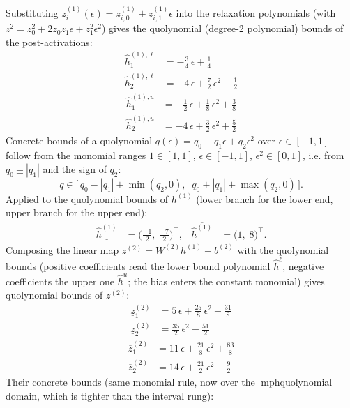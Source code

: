 \documentclass[11pt]{article}
\begin{document}
Substituting $z^{(1)}_i(\epsilon) = z^{(1)}_{i,0} + z^{(1)}_{i,1} \epsilon$ into the relaxation
polynomials (with $z^2 = z_0^2 + 2 z_0 z_1 \epsilon + z_1^2 \epsilon^2$) gives the quolynomial
(degree-2 polynomial) bounds of the post-activations:
\begin{align*}
\hat{h}^{(1),\ell}_{1} &= -\frac{3}{4}\,\epsilon + \frac{1}{4} \\
\hat{h}^{(1),\ell}_{2} &= -4\,\epsilon + \frac{7}{2}\,\epsilon^2 + \frac{1}{2}
\end{align*}
\begin{align*}
\hat{h}^{(1),u}_{1} &= -\frac{1}{2}\,\epsilon + \frac{1}{8}\,\epsilon^2 + \frac{3}{8} \\
\hat{h}^{(1),u}_{2} &= -4\,\epsilon + \frac{3}{2}\,\epsilon^2 + \frac{5}{2}
\end{align*}
Concrete bounds of a quolynomial $q(\epsilon) = q_0 + q_1 \epsilon + q_2 \epsilon^2$ over
$\epsilon \in [-1, 1]$ follow from the monomial ranges $1 \in [1, 1]$, $\epsilon \in [-1, 1]$,
$\epsilon^2 \in [0, 1]$, i.e. from $q_0 \pm |q_1|$ and the sign of $q_2$:
\begin{equation*}
q \in \bigl[\, q_0 - |q_1| + \min(q_2, 0), \;\; q_0 + |q_1| + \max(q_2, 0) \,\bigr].
\end{equation*}
Applied to the quolynomial bounds of $h^{(1)}$ (lower branch for the lower end, upper branch for the upper end):
\begin{align*}
\underline{\hat{h}^{(1)}} &= \bigl(\frac{-1}{2},\; \frac{-7}{2}\bigr)^{\!\top}, & \overline{\hat{h}^{(1)}} &= \bigl(1,\; 8\bigr)^{\!\top}.
\end{align*}
Composing the linear map $z^{(2)} = W^{(2)} h^{(1)} + b^{(2)}$ with the quolynomial bounds
(positive coefficients read the lower bound polynomial $\hat{h}^{\ell}$, negative coefficients the
upper one $\hat{h}^{u}$; the bias enters the constant monomial) gives quolynomial bounds of
$z^{(2)}$:
\begin{align*}
\underline{z}^{(2)}_{1} &= 5\,\epsilon + \frac{25}{8}\,\epsilon^2 + \frac{31}{8} \\
\underline{z}^{(2)}_{2} &= \frac{35}{2}\,\epsilon^2 - \frac{51}{2}
\end{align*}
\begin{align*}
\overline{z}^{(2)}_{1} &= 11\,\epsilon + \frac{21}{8}\,\epsilon^2 + \frac{83}{8} \\
\overline{z}^{(2)}_{2} &= 14\,\epsilon + \frac{21}{2}\,\epsilon^2 - \frac{9}{2}
\end{align*}
Their concrete bounds (same monomial rule, now over the mph{quolynomial} domain, which is tighter than the interval rung):
\end{document}
